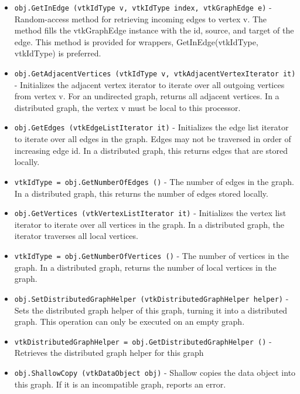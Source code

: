 \begin{itemize}
\item  \verb|obj.GetInEdge (vtkIdType v, vtkIdType index, vtkGraphEdge e)| -  Random-access method for retrieving incoming edges to vertex v.
 The method fills the vtkGraphEdge instance with the id, source, and
 target of the edge. This method is provided for wrappers,
 GetInEdge(vtkIdType, vtkIdType) is preferred.

\item  \verb|obj.GetAdjacentVertices (vtkIdType v, vtkAdjacentVertexIterator it)| -  Initializes the adjacent vertex iterator to iterate over
 all outgoing vertices from vertex v.  For an undirected graph,
 returns all adjacent vertices. In a distributed graph, the vertex
 v must be local to this processor.

\item  \verb|obj.GetEdges (vtkEdgeListIterator it)| -  Initializes the edge list iterator to iterate over all
 edges in the graph. Edges may not be traversed in order of
 increasing edge id. In a distributed graph, this returns edges
 that are stored locally.

\item  \verb|vtkIdType = obj.GetNumberOfEdges ()| -  The number of edges in the graph. In a distributed graph,
 this returns the number of edges stored locally.

\item  \verb|obj.GetVertices (vtkVertexListIterator it)| -  Initializes the vertex list iterator to iterate over all
 vertices in the graph. In a distributed graph, the iterator
 traverses all local vertices.

\item  \verb|vtkIdType = obj.GetNumberOfVertices ()| -  The number of vertices in the graph. In a distributed graph,
 returns the number of local vertices in the graph.

\item  \verb|obj.SetDistributedGraphHelper (vtkDistributedGraphHelper helper)| -  Sets the distributed graph helper of this graph, turning it into a
 distributed graph. This operation can only be executed on an empty
 graph.

\item  \verb|vtkDistributedGraphHelper = obj.GetDistributedGraphHelper ()| -  Retrieves the distributed graph helper for this graph

\item  \verb|obj.ShallowCopy (vtkDataObject obj)| -  Shallow copies the data object into this graph.
 If it is an incompatible graph, reports an error.


\end{itemize}
